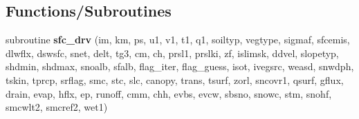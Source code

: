 \subsection*{Functions/\+Subroutines}
\begin{DoxyCompactItemize}
\item 
\mbox{\label{group___n_o_a_h_ga4081cc761ec0846c01aa1b510d79f00d}} 
subroutine {\bfseries sfc\+\_\+drv} (im, km, ps, u1, v1, t1, q1, soiltyp, vegtype, sigmaf, sfcemis, dlwflx, dswsfc, snet, delt, tg3, cm, ch, prsl1, prslki, zf, islimsk, ddvel, slopetyp, shdmin, shdmax, snoalb, sfalb, flag\+\_\+iter, flag\+\_\+guess, isot, ivegsrc, weasd, snwdph, tskin, tprcp, srflag, smc, stc, slc, canopy, trans, tsurf, zorl, sncovr1, qsurf, gflux, drain, evap, hflx, ep, runoff, cmm, chh, evbs, evcw, sbsno, snowc, stm, snohf, smcwlt2, smcref2, wet1)
\end{DoxyCompactItemize}
